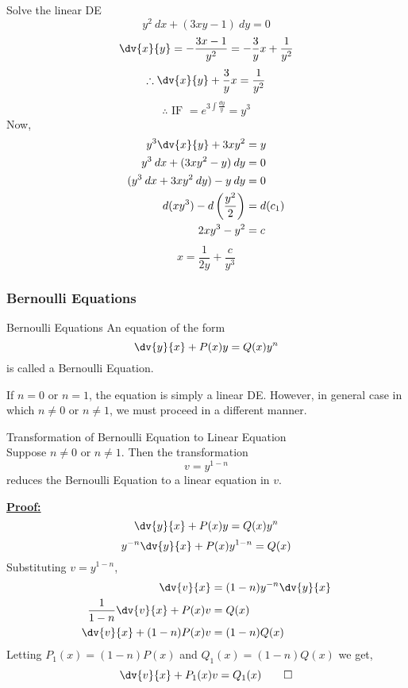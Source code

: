 \begin{example}{Solve the linear DE \[
    y^2 \: d{x} + (3xy-1) \: d{y} = 0
\]}{} \vspace{-20pt}
    \[ \dv{x}{y} = -\frac{3x-1}{y^2} = -\frac{3}{y}x + \frac{1}{y^2} \]
    \[ \therefore \dv{x}{y} + \frac{3}{y}x = \frac{1}{y^2} \]
    \[ \therefore \text{ IF } = e^{3 \int{\frac{dy}{y}}} = y^3 \]
    Now,
    \begin{align*}
        y^3\dv{x}{y} + 3xy^2 &= y \\
        y^3 \: dx + (3xy^2 - y) \: dy &= 0 \\
        (y^3 \: dx + 3xy^2 \: dy) - y \: dy &= 0 \\
        d(xy^3) - d\left( \frac{y^2}{2} \right) &= d(c_1) \\
        2xy^3 - y^2 &= c
    \end{align*}
    \[ \boxed{ x = \frac{1}{2y} + \frac{c}{y^3} } \]
\end{example} \vspace{10pt}



\subsubsection{Bernoulli Equations}

\begin{definition}{Bernoulli Equations}{}
    An equation of the form \[
        \dv{y}{x} + P(x)y = Q(x)y^n
    \] is called a Bernoulli Equation. \\
\end{definition} \vspace{10pt}

If $n=0$ or $n=1$, the equation is simply a linear DE. However, in general case in which $n \neq 0$ or $n \neq 1$, we must proceed in a different manner.

\begin{theorem}{Transformation of Bernoulli Equation to Linear Equation}{}
    \\Suppose $n \neq 0$ or $n \neq 1$. Then the transformation  \[
        v = y^{1-n}
    \] reduces the Bernoulli Equation to a linear equation in $v$.
\end{theorem}

\underline{\textbf{Proof:}}\\
\[ \dv{y}{x} + P(x)y = Q(x) y^n \]
\[ y^{-n}\dv{y}{x} + P(x)y^{1-n} = Q(x) \]
Substituting $v = y^{1-n}$,
\begin{align*}
    \dv{v}{x} &= (1-n)y^{-n}\dv{y}{x} \\
    \frac{1}{1-n}\dv{v}{x} + P(x)v &= Q(x) \\
    \dv{v}{x} + (1-n)P(x)v &= (1-n)Q(x)
\end{align*}
Letting $P_1(x) = (1-n)P(x)$ and $Q_1(x) = (1-n)Q(x)$ we get,
\[ \dv{v}{x} + P_1(x)v = Q_1(x) \qed \] 

